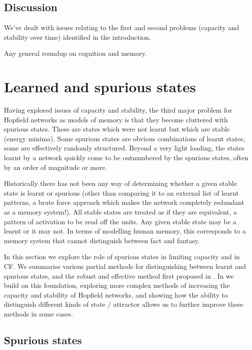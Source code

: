 \subsection{Discussion}

We've dealt with issues relating to the first and second problems (capacity and stability over time) identified in the introduction.

Any general roundup on cognition and memory. 


\newpage{}%
\section{Learned and spurious states}
\label{sec:States}

Having explored issues of capacity and stability, the third major problem for Hopfield networks as models of memory is that they become cluttered with spurious states.  These are states which were not learnt but which are stable (energy minima).  Some spurious states are obvious combinations of learnt states, some are effectively randomly structured.  Beyond a very light loading, the states learnt by a network quickly come to be outnumbered by the spurious states, often by an order of magnitude or more. 

Historically there has not been any way of determining whether a given stable state is learnt or spurious (other than comparing it to an external list of learnt patterns, a brute force approach which makes the network completely redundant as a memory system!).  All stable states are treated as if they are equivalent, a pattern of activation to be read off the units.  Any given stable state may be a learnt or it may not.  In terms of modelling human memory, this corresponds to a memory system that cannot distinguish between fact and fantasy.  

In this section we explore the role of spurious states in limiting capacity and in CF.  We summarise various partial methods for distinguishing between learnt and spurious states, and the robust and effective method first proposed in \cite{Robins2004}.  In \cite{McCallum2010b} we build on this foundation, exploring more complex methods of increasing the capacity and stability of Hopfield networks, and showing how the ability to distinguish different kinds of state / attractor allows us to further improve these methods in some cases.

\subsection{Spurious states}  %

